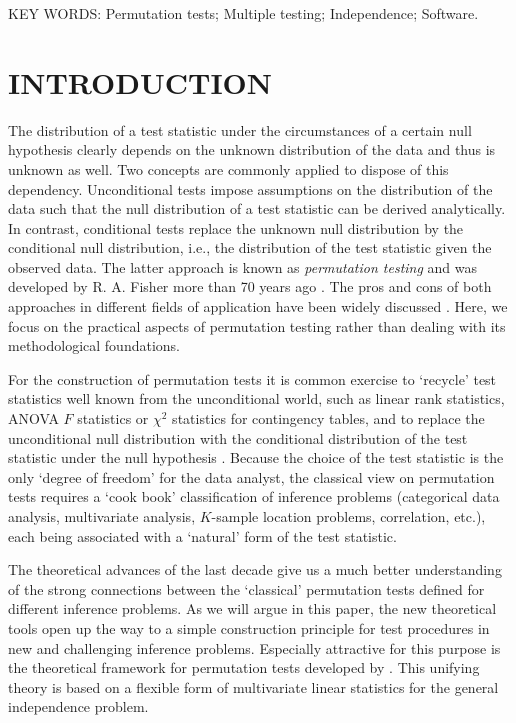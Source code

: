 \documentclass{article}
\begin{document}
\noindent
KEY WORDS: Permutation tests; Multiple testing; Independence; Software.
\newline



\section{INTRODUCTION}

The distribution of a test statistic under the circumstances of a certain
null hypothesis clearly depends on the unknown distribution of the data and
thus is unknown as well.
Two concepts are commonly applied to dispose of this dependency.
Unconditional tests impose assumptions on the distribution of the data such
that the null distribution of a test statistic can be derived analytically. In contrast, 
conditional tests
replace the unknown null distribution by the conditional null distribution,
i.e., the distribution of the test statistic given the observed data. The
latter approach is known as \textit{permutation testing} and was developed
by R. A. Fisher more than 70 years ago \citep{Fisher1935}. 
The pros and cons of both approaches in different fields of application 
have been widely discussed \citep[e.g.~by][]{why-permut:1998,pros-and-c:2000,Shuster2005}.
Here, we focus on the practical aspects of permutation testing rather than
dealing with its methodological foundations.

For the construction of permutation tests it is common exercise to `recycle'
test statistics well known from the unconditional world, such as linear rank
statistics, ANOVA $F$ statistics or $\chi^2$ statistics for
contingency tables, and to replace the unconditional null distribution with
the conditional distribution of the test statistic under the null
hypothesis \citep{Edgington1987,Good2000,Pesarin2001,Ernst2004}. 
Because the choice of the test statistic is the only `degree of freedom' for
the data analyst,
the classical view on permutation tests requires 
a `cook book' classification of inference problems (categorical data
analysis, multivariate analysis, $K$-sample location problems, correlation,
etc.), each being associated with a `natural' form of the test statistic.

The theoretical advances of the last decade \citep[notably][]{StrasserWeber1999,JanssenPauls2003}
give us a much better understanding of the strong connections between the 
`classical' permutation tests defined for different inference problems. 
As we will argue in this paper, the new
theoretical tools open up the way to a simple construction principle 
for test procedures in new and challenging inference problems.
Especially attractive for this purpose is the theoretical framework for
permutation tests developed by \cite{StrasserWeber1999}. This unifying
theory is based on a flexible form of multivariate linear statistics for the
general independence problem. 
\end{document}
